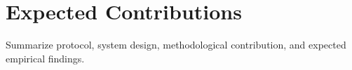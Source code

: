 \section{Expected Contributions}
Summarize protocol, system design, methodological contribution, and expected empirical findings.
